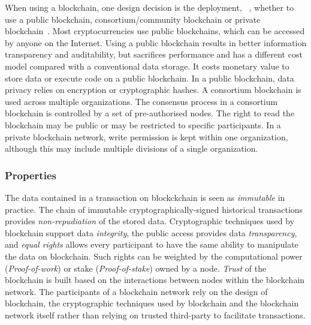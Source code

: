 When using a blockchain, one design decision is the deployment, \ie~, whether to use a public blockchain, consortium/community blockchain or private blockchain~\cite{Sherry:ICSA2017}. Most cryptocurrencies use public blockchains, which can be accessed by anyone on the Internet. %
Using a public blockchain results in better information transparency and auditability, but sacrifices performance and has a different cost model compared with a conventional data storage. It costs monetary value to store data or execute code on a public blockchain. In a public blockchain, data privacy relies on encryption or cryptographic hashes. A consortium blockchain is used across multiple organizations. The consensus process in a consortium blockchain is controlled by a set of pre-authorised nodes. The right to read the blockchain may be public or may be restricted to specific participants. In a private blockchain network, write permission is kept within one organization, although this may include multiple divisions of a single organization. %

\subsubsection{Properties}
\label{sec:properties}

The data contained in a transaction on blockckchain is seen as \textit{immutable} in practice. The chain of immutable cryptographically-signed historical transactions provides \textit{non-repudiation} of the stored data. Cryptographic techniques used by blockchain support data \textit{integrity}, the public access provides data \textit{transparency}, and \textit{equal rights} allows every participant to have the same ability to manipulate the data on blockchain. Such rights can be weighted by the computational power (\emph{Proof-of-work}) or stake (\emph{Proof-of-stake}) owned by a node. \textit{Trust} of the blockchain is built based on the interactions between nodes within the blockchain network. The participants of a blockchain network rely on the design of blockchain, the cryptographic techniques used by blockchain and the blockchain network itself rather than relying on trusted third-party to facilitate transactions. 

